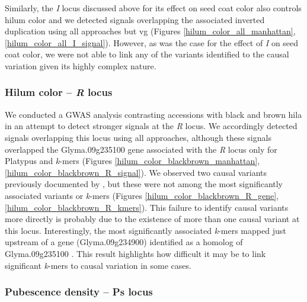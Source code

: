 Similarly, the \textit{I} locus discussed above for its effect on seed coat
color also controls hilum color and we detected signals overlapping the
associated inverted duplication using all approaches but vg (Figures
\ref{hilum_color_all_manhattan}, \ref{hilum_color_all_I_signal}). However,
as was the case for the effect of \textit{I} on seed coat color, we were
not able to link any of the variants identified to the causal variation given
its highly complex nature.

\subsubsection{Hilum color -- \textit{R} locus}
\label{sv-gwas-main-results-hilum-color-r}

We conducted a GWAS analysis contrasting accessions with black and brown hila
in an attempt to detect stronger signals at the \textit{R} locus.  We
accordingly detected signals overlapping this locus using all approaches,
although these signals overlapped the Glyma.09g235100 gene associated with the
\textit{R} locus only for Platypus and \textit{k}-mers (Figures
\ref{hilum_color_blackbrown_manhattan}, \ref{hilum_color_blackbrown_R_signal}).
We observed two causal variants previously documented by \cite{gillman2011},
but these were not among the most significantly associated variants or
\textit{k}-mers (Figures \ref{hilum_color_blackbrown_R_gene},
\ref{hilum_color_blackbrown_R_kmers}).  This failure to identify causal
variants more directly is probably due to the existence of more than one causal
variant at this locus. Interestingly, the most significantly associated
\textit{k}-mers mapped just upstream of a gene (Glyma.09g234900) identified as
a homolog of Glyma.09g235100 \citep{gillman2011}. This result highlights how
difficult it may be to link significant \textit{k}-mers to causal variation in
some cases.

\subsubsection{Pubescence density -- Ps locus}
\label{sv-gwas-main-results-pubescence-density-ps}

